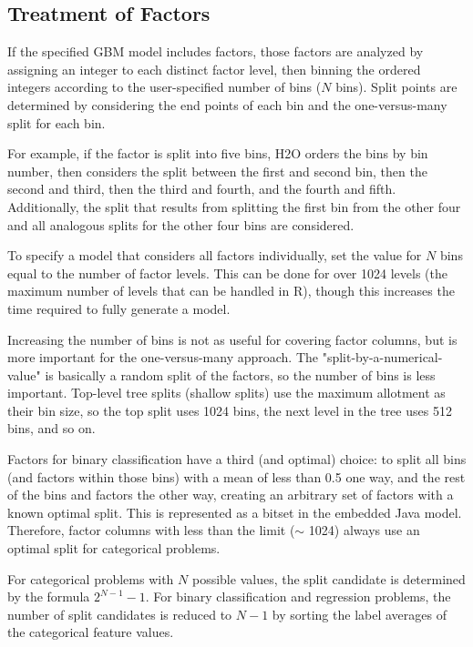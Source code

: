 \subsection{Treatment of Factors}

If the specified GBM model includes factors, those factors are analyzed by assigning an integer to each distinct
factor level, then binning the ordered integers according to the user-specified number of bins ($N$ bins). Split
points are determined by considering the end points of each bin and the one-versus-many split for each bin.

For example, if the factor is split into five bins, H2O orders the bins by bin number, then considers the split between the first and second bin, then the second and third, then the third and fourth, and the fourth and fifth.
Additionally, the split that results from splitting the first bin from the other four and all analogous splits for
the other four bins are considered. 

To specify a model that considers all factors individually, set the value for
$N$ bins equal to the number of factor levels. This can be done for over 1024 levels (the maximum number of levels
that can be handled in R), though this increases the time required to fully generate a model.

Increasing the number of bins is not as useful for covering factor columns, but is more important for the
one-versus-many approach. The "split-by-a-numerical-value" is basically a random split of the factors, so the
number of bins is less important. Top-level tree splits (shallow splits) use the maximum allotment as their bin size,
so the top split uses 1024 bins, the next level in the tree uses 512 bins, and so on.

Factors for binary classification have a third (and optimal) choice: to split all bins (and factors within those bins)
with a mean of less than 0.5 one way, and the rest of the bins and factors the other way, creating an arbitrary
set of factors with a known optimal split. This is represented as a bitset in the embedded Java model. Therefore,
factor columns with less than the limit ($\mathtt{\sim}$ 1024) always use an optimal split for categorical problems.

For categorical problems with $N$ possible values, the split candidate is determined by the formula $2^{N-1}-1$.
For binary classification and regression problems, the number of split candidates is reduced to $N-1$ by sorting
the label averages of the categorical feature values.

